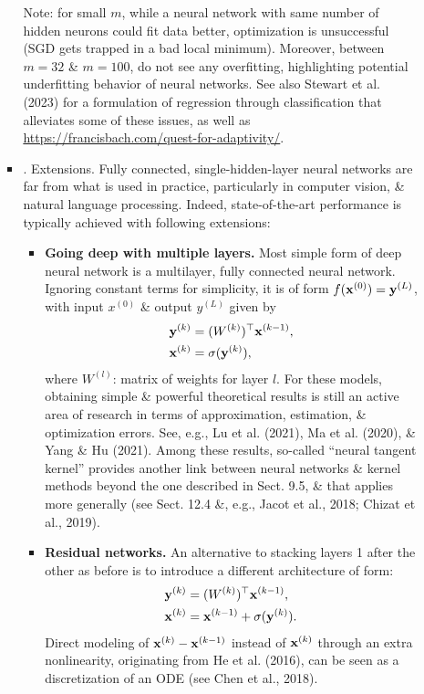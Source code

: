 \documentclass{article}
\begin{document}
\begin{enumerate}
\begin{itemize}
\begin{itemize}
			Note: for small $m$, while a neural network with same number of hidden neurons could fit data better, optimization is unsuccessful (SGD gets trapped in a bad local minimum). Moreover, between $m = 32$ \& $m = 100$, do not see any overfitting, highlighting potential underfitting behavior of neural networks. See also Stewart et al. (2023) for a formulation of regression through classification that alleviates some of these issues, as well as \url{https://francisbach.com/quest-for-adaptivity/}.
			\item {. Extensions.} Fully connected, single-hidden-layer neural networks are far from what is used in practice, particularly in computer vision, \& natural language processing. Indeed, state-of-the-art performance is typically achieved with following extensions:
			\begin{itemize}
				\item {\bf Going deep with multiple layers.} Most simple form of deep neural network is a multilayer, fully connected neural network. Ignoring constant terms for simplicity, it is of form $f({\bf x}^{(0)}) = {\bf y}^{(L)}$, with input $x^{(0)}$ \& output $y^{(L)}$ given by
				\begin{align}
					{\bf y}^{(k)} &= (W^{(k)})^\top{\bf x}^{(k-1)},\\
					{\bf x}^{(k)} &= \sigma({\bf y}^{(k)}),
				\end{align}
				where $W^{(l)}$: matrix of weights for layer $l$. For these models, obtaining simple \& powerful theoretical results is still an active area of research in terms of approximation, estimation, \& optimization errors. See, e.g., Lu et al. (2021), Ma et al. (2020), \& Yang \& Hu (2021). Among these results, so-called ``neural tangent kernel'' provides another link between neural networks \& kernel methods beyond the one described in Sect. 9.5, \& that applies more generally (see Sect. 12.4 \&, e.g., Jacot et al., 2018; Chizat et al., 2019).
				\item {\bf Residual networks.} An alternative to stacking layers 1 after the other as before is to introduce a different architecture of form:
				\begin{align}
					{\bf y}^{(k)} &= (W^{(k)})^\top{\bf x}^{(k-1)},\\
					{\bf x}^{(k)} &= {\bf x}^{(k-1)} + \sigma({\bf y}^{(k)}).
				\end{align}
				Direct modeling of ${\bf x}^{(k)} - {\bf x}^{(k-1)}$ instead of ${\bf x}^{(k)}$ through an extra nonlinearity, originating from He et al. (2016), can be seen as a discretization of an ODE (see Chen et al., 2018).

\end{itemize}
\end{itemize}
\end{itemize}
\end{enumerate}
\end{document}
